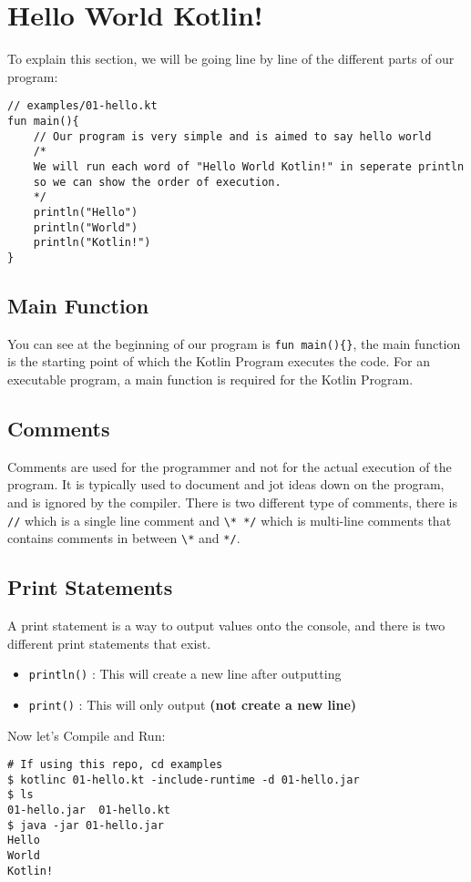 \chapter{Hello World Kotlin!}

To explain this section, we will be going line by line of the different parts of our program:

\begin{verbatim}
// examples/01-hello.kt
fun main(){
    // Our program is very simple and is aimed to say hello world 
    /* 
    We will run each word of "Hello World Kotlin!" in seperate println 
    so we can show the order of execution. 
    */
    println("Hello")
    println("World")
    println("Kotlin!")
}

\end{verbatim}

\section{Main Function}
You can see at the beginning of our program is \verb!fun main(){}!, the main function is the starting
point of which the Kotlin Program executes the code. For an executable program, a main function 
is required for the Kotlin Program.

\section{Comments}
Comments are used for the programmer and not for the actual execution of the program. It is typically used
to document and jot ideas down on the program, and is ignored by the compiler. There is two different type 
of comments, there is \verb!//! which is a single line comment and \verb!\* */! which is multi-line comments
that contains comments in between \verb!\*! and \verb!*/!.


\section{Print Statements}
A print statement is a way to output values onto the console, and there is two different print statements that exist.  
\begin{itemize}
    \item \verb!println()! : This will create a new line after outputting 
    \item \verb!print()! : This will only output \textbf{(not create a new line)}
\end{itemize}

Now let's Compile and Run: 
\begin{verbatim}
# If using this repo, cd examples
$ kotlinc 01-hello.kt -include-runtime -d 01-hello.jar 
$ ls 
01-hello.jar  01-hello.kt
$ java -jar 01-hello.jar 
Hello
World
Kotlin!
\end{verbatim}

